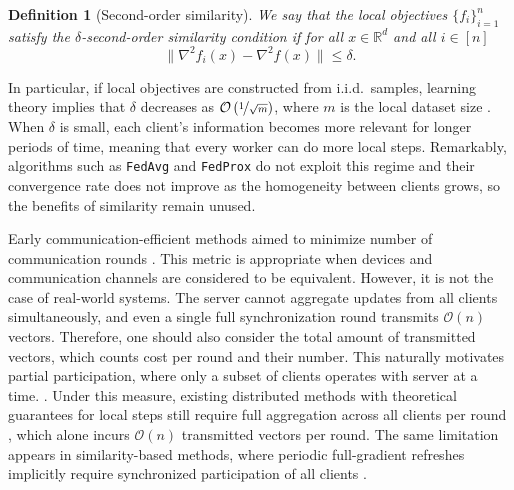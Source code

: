 \documentclass{article}
\newtheorem{definition}{Definition}
\begin{document}
\begin{definition}[Second-order similarity]
\label{second-order-similarity}
We say that the local objectives $\{f_i\}_{i=1}^n$ satisfy the $\delta$-second-order similarity condition if for all $x \in \mathbb{R}^d$ and all $i \in [n]$
\begin{equation}
    \|\nabla^2 f_i(x) - \nabla^2 f(x)\| \le \delta.
\end{equation}
\end{definition}

In particular, if local objectives are constructed from i.i.d.\ samples, learning theory implies that $\delta$ decreases as $\mathcal{O}\left(\nicefrac{1}{\sqrt m}\right)$, where $m$ is the local dataset size \citep{hendrikx2020statistically}. When $\delta$ is small, each client's information becomes more relevant for longer periods of time, meaning that every worker can do more local steps. Remarkably, algorithms such as \texttt{FedAvg} and \texttt{FedProx} do not exploit this regime and their convergence rate does not improve as the homogeneity between clients grows, so the benefits of similarity remain unused. 

Early communication-efficient methods aimed to minimize number of communication rounds \citep{mcmahan2017communication, stich2018local, kovalev2022optimal}. This metric is appropriate when devices and communication channels are considered to be equivalent. However, it is not the case of real-world systems. The server cannot aggregate updates from all clients simultaneously, and even a single full synchronization round transmits $\mathcal{O}(n)$ vectors. Therefore, one should also consider the total amount of transmitted vectors, which counts cost per round and their number. This naturally motivates partial participation, where only a subset of clients operates with server at a time. \cite{mcmahan2017communication}. Under this measure, existing 
distributed methods with theoretical guarantees for local steps 
still require full aggregation across all clients per round 
\citep{stich2018local, khaled2020tighter}, which alone incurs 
$\mathcal{O}(n)$ transmitted vectors per round. The same limitation 
appears in similarity-based methods, where periodic full-gradient 
refreshes implicitly require synchronized participation of all clients \citep{kovalev2022optimal, lin2023stochastic}.

\end{document}

